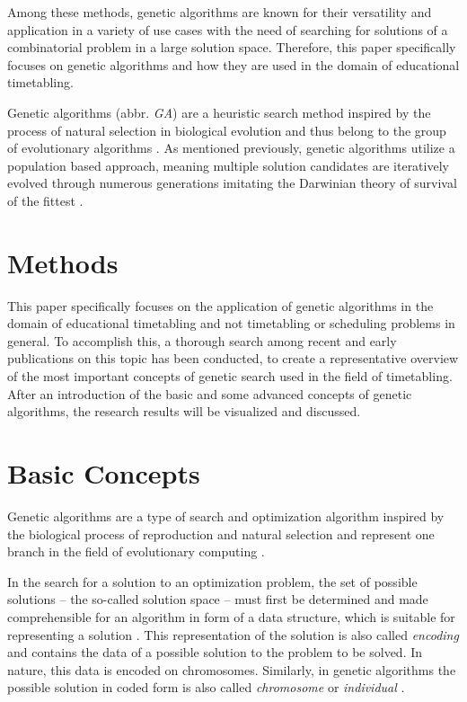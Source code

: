 \documentclass[sigconf]{acmart}
\begin{document}
Among these methods, genetic algorithms are known for their versatility and
application in a variety of use cases with the need of searching for solutions
of a combinatorial problem in a large solution space.
Therefore, this paper specifically focuses on genetic algorithms and how they
are used in the domain of educational timetabling.

Genetic algorithms (abbr. \textit{GA}) are a heuristic search method inspired by
the process of natural selection in biological evolution and thus belong to
the group of evolutionary algorithms \cite{Katoch2021}. As mentioned previously,
genetic algorithms utilize a population based approach, meaning multiple
solution candidates are iteratively evolved through numerous generations
imitating the Darwinian theory of survival of the fittest \cite{Katoch2021}.



\section{Methods}
This paper specifically focuses on the application of genetic algorithms
in the domain of educational timetabling and not timetabling or scheduling
problems in general.
To accomplish this, a thorough search among recent and early publications on
this topic has been conducted, to create a representative overview of the most
important concepts of genetic search used in the field of timetabling.
After an introduction of the basic and some advanced concepts of genetic
algorithms, the research results will be visualized and discussed.



\section{Basic Concepts}
Genetic algorithms are a type of search and optimization algorithm inspired
by the biological process of reproduction and natural selection and represent
one branch in the field of evolutionary computing \cite{goldberg1989, Carr2014}.

In the search for a solution to an optimization problem, the set of possible
solutions -- the so-called solution space -- must first be determined and made
comprehensible for an algorithm in form of a data structure, which is suitable
for representing a solution \cite{Affenzeller2009}.
This representation of the solution is also called \textit{encoding} and
contains the data of a possible solution to the problem to be solved.
In nature, this data is encoded on chromosomes. Similarly, in genetic algorithms
the possible solution in coded form is also called \textit{chromosome} or
\textit{individual} \cite{Affenzeller2009}.
\end{document}
